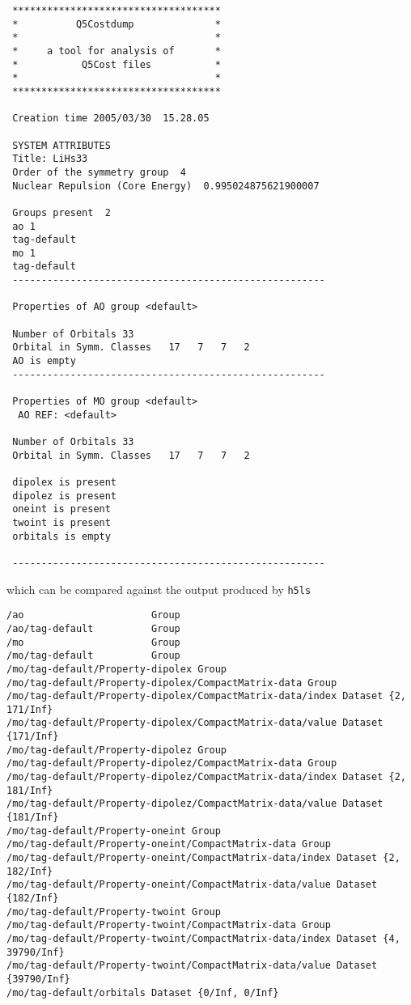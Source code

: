 {\footnotesize
\begin{verbatim}
 ************************************
 *          Q5Costdump              *
 *                                  *
 *     a tool for analysis of       *
 *           Q5Cost files           *
 *                                  *
 ************************************
 
 Creation time 2005/03/30  15.28.05
 
 SYSTEM ATTRIBUTES
 Title: LiHs33                                                          
 Order of the symmetry group  4
 Nuclear Repulsion (Core Energy)  0.995024875621900007
 
 Groups present  2
 ao 1
 tag-default
 mo 1
 tag-default
 ------------------------------------------------------
 
 Properties of AO group <default>
 
 Number of Orbitals 33
 Orbital in Symm. Classes   17   7   7   2
 AO is empty
 ------------------------------------------------------
 
 Properties of MO group <default>
  AO REF: <default>
 
 Number of Orbitals 33
 Orbital in Symm. Classes   17   7   7   2
 
 dipolex is present
 dipolez is present
 oneint is present
 twoint is present
 orbitals is empty
 
 ------------------------------------------------------

\end{verbatim}
}
which can be compared against the output produced by \texttt{h5ls}
{\footnotesize
\begin{verbatim} 
/ao                      Group
/ao/tag-default          Group
/mo                      Group
/mo/tag-default          Group
/mo/tag-default/Property-dipolex Group
/mo/tag-default/Property-dipolex/CompactMatrix-data Group
/mo/tag-default/Property-dipolex/CompactMatrix-data/index Dataset {2, 171/Inf}
/mo/tag-default/Property-dipolex/CompactMatrix-data/value Dataset {171/Inf}
/mo/tag-default/Property-dipolez Group
/mo/tag-default/Property-dipolez/CompactMatrix-data Group
/mo/tag-default/Property-dipolez/CompactMatrix-data/index Dataset {2, 181/Inf}
/mo/tag-default/Property-dipolez/CompactMatrix-data/value Dataset {181/Inf}
/mo/tag-default/Property-oneint Group
/mo/tag-default/Property-oneint/CompactMatrix-data Group
/mo/tag-default/Property-oneint/CompactMatrix-data/index Dataset {2, 182/Inf}
/mo/tag-default/Property-oneint/CompactMatrix-data/value Dataset {182/Inf}
/mo/tag-default/Property-twoint Group
/mo/tag-default/Property-twoint/CompactMatrix-data Group
/mo/tag-default/Property-twoint/CompactMatrix-data/index Dataset {4, 39790/Inf}
/mo/tag-default/Property-twoint/CompactMatrix-data/value Dataset {39790/Inf}
/mo/tag-default/orbitals Dataset {0/Inf, 0/Inf}
\end{verbatim}
}


